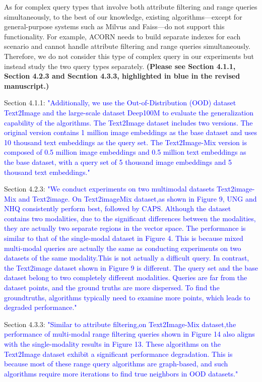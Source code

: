 \documentclass[sigconf, nonacm]{acmart}
\begin{document}
As for complex query types that involve both attribute filtering and range queries simultaneously, to the best of our knowledge, existing algorithms—except for general-purpose systems such as Milvus and Faiss—do not support this functionality. For example, ACORN needs to build separate indexes for each scenario and cannot handle attribute filtering and range queries simultaneously. Therefore, we do not consider this type of complex query in our experiments but instead study the two query types separately. \textbf{(Please see Section 4.1.1, Section 4.2.3 and Secntion 4.3.3, highlighted in blue in the revised manuscript.)  
}

Section 4.1.1:\textcolor{blue}{
"Additionally, we use the Out-of-Distribution (OOD) dataset Text2Image and the large-scale dataset Deep100M to evaluate the generalization capability of the algorithms. The Text2Image dataset includes two versions. The original version contains 1 million image embeddings as the base dataset and uses 10 thousand text embeddings as the query set. The Text2Image-Mix version is composed of 0.5 million image embeddings and 0.5 million text embeddings as the base dataset, with a query set of 5 thousand image embeddings and 5 thousand text embeddings."
}

Section 4.2.3: \textcolor{blue}{
	"We conduct experiments on two multimodal datasets Text2image-Mix and Text2image. On Text2imageMix dataset,as shown in Figure 9, UNG and NHQ consistently perform best, followed by CAPS. Although the dataset contains two modalities, due to the significant differences between the modalities, they are actually two separate regions in the vector space. The performance is similar to that of the single-modal dataset in Figure 4. This is because mixed multi-modal queries are actually the same as conducting experiments on two datasets of the same modality.This is not actually a difficult query. In contrast, the Text2image dataset shown in Figure 9 is different. The query set and the base dataset belong to two completely different modalities. Queries are far from the dataset points, and the ground truths are more dispersed. To find the groundtruths, algorithms typically need to examine more points, which leads to degraded performance." 
}

Section 4.3.3:\textcolor{blue}{
		"Similar to attribute filtering,on Text2Image-Mix dataset,the performance of multi-modal range filtering queries shown in Figure 14 also aligns with the single-modality results in Figure 13. These algorithms on the Text2Image dataset exhibit a significant performance degradation. This is because most of these range query algorithms are graph-based, and such algorithms require more iterations to find true neighbors in OOD datasets."
}
\end{document}
